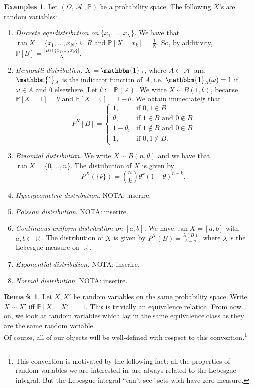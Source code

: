 \documentclass[12pt,a4paper]{report}
\theoremstyle{definition}
\newtheorem*{examples}{Examples}
\newtheorem*{remark}{Remark}
\theoremstyle{num.custom-title}
\DeclareMathOperator{\ran}{ran}
\DeclareMathOperator{\A}{\mathcal{A}}
\DeclareMathOperator{\R}{\mathbb{R}}
\DeclareMathOperator{\sse}{\subseteq}
\newcommand{\ol}{\overline}
\renewcommand{\1}{\mathbbm{1}}
\renewcommand{\P}{\mathbb{P}}
\begin{document}
\begin{examples} Let $(\Omega, \A, \P)$ be a probability space. The following $X$'s are random variables:
\begin{enumerate}
\item \emph{Discrete equidistribution on $\{x_1,...,x_N\}$.} We have that $\ran X = \{x_1,...,x_N\} \sse \ol{R}$ and $\P[X=x_k] = \frac{1}{N}$. So, by additivity, $\P[B] = \frac{|B \cap \{x_1,...,x_N\}|}{N}$.
\item \emph{Bernoulli distribution.} $X = \1_A$, where $A \in \A$ and $\1_A$ is the indicator function of $A$, i.e. $\1_A(\omega)=1$ if $\omega \in A$ and $0$ elsewhere. Let $\theta := \P(A)$. We write $X \sim B(1,\theta)$, because $\P[X=1]=\theta$ and $\P[X=0]=1-\theta$. We obtain immediately that
\[
P^X[B] =
\begin{cases}
1, &\text{if } 0,1 \in B\\
\theta, &\text{if } 1 \in B \text{ and } 0 \not\in B\\
1-\theta, &\text{if } 1 \not\in B \text{ and } 0 \in B\\
1, &\text{if } 0,1 \not\in B.
\end{cases}
\]
\item \emph{Binomial distribution.} We write $X \sim B(n,\theta)$ and we have that $\ran X = \{0,...,n\}$. The distribution of $X$ is given by
\[
P^X(\{k\}) = \binom{n}{k} \theta^k (1-\theta)^{n-k}.
\]
\item \emph{Hypergeometric distribution.} NOTA: inserire.
\item \emph{Poisson distribution.} NOTA: inserire.
\item \emph{Continuous uniform distribution on $[a,b]$.} We have $\ran X = [a,b]$ with $a,b \in \R$. The distribution of $X$ is given by $P^X(B)=\frac{\lambda(B)}{b-a}$, where $\lambda$ is the Lebesgue measure on $\R$.
\item \emph{Exponential distribution.} NOTA: inserire.
\item \emph{Normal distribution.} NOTA: inserire.
\end{enumerate}
\end{examples}

\begin{remark}
Let $X,X'$ be random variables on the same probability space. Write $X \sim X'$ iff $\P[X=X']=1$. This is trivially an equivalence relation. From now on, we look at random variables which lay in the same equivalence class as they are the same random variable. \\
Of course, all of our objects will be well-defined with respect to this convention.\footnote{This convention is motivated by the following fact: all the properties of random variables we are interested in, are always related to the Lebesgue integral. But the Lebesgue integral ``can't see'' sets wich have zero measure.}
\end{remark}
\end{document}
